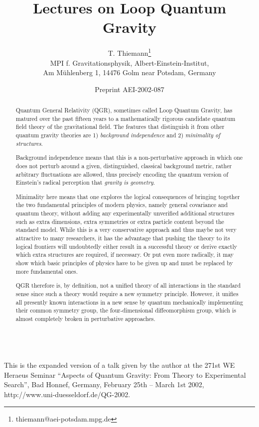\documentclass[12pt]{report}
\title{Lectures on Loop Quantum Gravity}
\author{T. Thiemann\thanks{thiemann@aei-potsdam.mpg.de} \\
       MPI f. Gravitationsphysik, Albert-Einstein-Institut, \\
           Am M\"uhlenberg 1, 14476 Golm near Potsdam, Germany}
\date{{\small Preprint AEI-2002-087}}
\begin{document}
\maketitle

\begin{abstract}
Quantum General Relativity (QGR), sometimes called Loop Quantum Gravity,
has matured over the past fifteen years to a mathematically rigorous
candidate quantum field theory of the gravitational field. The features
that distinguish it from other quantum gravity theories are 
1) {\it background independence} and 2) {\it minimality of structures}. 

Background 
independence means that this is a non-perturbative approach in which one 
does not perturb around a given, distinguished, classical background 
metric, rather arbitrary fluctuations are allowed, thus precisely encoding
the quantum version of Einstein's radical perception that {\it gravity is 
geometry}.  

Minimality here means that one explores the logical consequences 
of bringing together the two fundamental principles of modern physics,
namely general covariance and quantum theory, without adding any 
experimentally unverified additional structures such as extra dimensions,
extra symmetries or extra particle content beyond the standard model.
While this is a very conservative approach and thus maybe not very 
attractive to many researchers, it has the advantage that pushing the 
theory to its logical frontiers will undoubtedly either result in a 
successful theory or derive exactly which extra structures are 
required, if necessary. Or put even more radically, it may
show which basic principles of physics have to be given up and 
must be replaced by more fundamental ones. 

QGR therefore is, by definition, not a unified theory of 
all interactions in the standard sense since such a theory would require a 
new symmetry principle. 
However, it unifies all presently known 
interactions in a new sense by quantum mechanically implementing their 
common symmetry group, the four-dimensional diffeomorphism group, which is 
almost completely broken in perturbative approaches. 
\end{abstract}

\newpage

{\small \tableofcontents}

\newpage

~~~~~\\
This is the expanded version of a talk given by the author 
at the 271st WE Heraeus Seminar ``Aspects of Quantum Gravity: From Theory
to Experimental Search'', Bad Honnef, Germany, February 25th -- March 1st 
2002, http://www.uni-duesseldorf.de/QG-2002.
\end{document}
